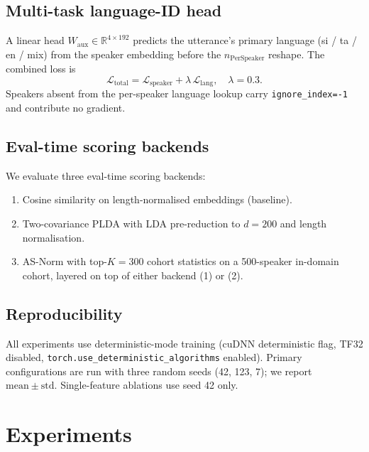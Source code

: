 \documentclass[11pt,a4paper]{article}
\begin{document}
\subsection{Multi-task language-ID head}
\label{sec:method:langaux}

A linear head $W_{\mathrm{aux}}\in\mathbb{R}^{4\times 192}$ predicts
the utterance's primary language (si / ta / en / mix) from the speaker
embedding before the $n_{\mathrm{PerSpeaker}}$ reshape. The combined
loss is
\begin{equation}
\mathcal{L}_{\mathrm{total}}
= \mathcal{L}_{\mathrm{speaker}}
+ \lambda \, \mathcal{L}_{\mathrm{lang}},
\quad \lambda=0.3.
\end{equation}
Speakers absent from the per-speaker language lookup carry
\texttt{ignore\_index=-1} and contribute no gradient.

\subsection{Eval-time scoring backends}
\label{sec:method:scoring}

We evaluate three eval-time scoring backends:
\begin{enumerate}
    \item Cosine similarity on length-normalised embeddings (baseline).
    \item Two-covariance PLDA \cite{sizov2014unifying} with LDA
    pre-reduction to $d=200$ and length normalisation.
    \item AS-Norm \cite{matejka2017analysis} with top-$K=300$ cohort
    statistics on a 500-speaker in-domain cohort, layered on top
    of either backend (1) or (2).
\end{enumerate}

\subsection{Reproducibility}
\label{sec:method:repro}

All experiments use deterministic-mode training (cuDNN deterministic
flag, TF32 disabled,
\texttt{torch.use\_deterministic\_algorithms} enabled). Primary
configurations are run with three random seeds (42, 123, 7); we
report $\mathrm{mean} \pm \mathrm{std}$. Single-feature ablations
use seed 42 only.

\section{Experiments}
\label{sec:experiments}
\end{document}
